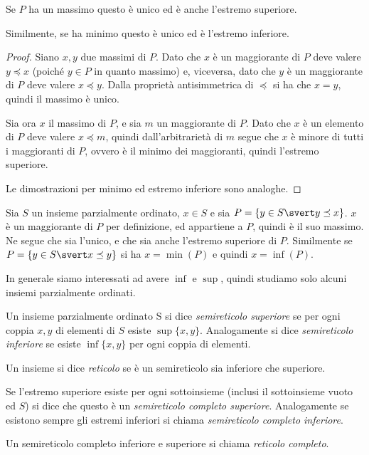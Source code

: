 \documentclass[12pt]{article}
\numberwithin{theorem}{subsection}
\begin{document}
\begin{prop}
	Se $P$ ha un massimo questo è unico ed è anche l'estremo superiore.
	
	Similmente, se ha minimo questo è unico ed è l'estremo inferiore.
\end{prop}
\begin{proof}
	Siano $x, y$ due massimi di $P$. Dato che $x$ è un maggiorante di $P$ deve valere $y \preceq x$ (poiché $y \in P$ in quanto massimo) e, viceversa, dato che $y$ è un maggiorante di $P$ deve valere $x \preceq y$. Dalla proprietà antisimmetrica di $\preceq$ si ha che $x = y$, quindi il massimo è unico.
	
	Sia ora $x$ il massimo di $P$, e sia $m$ un maggiorante di $P$. Dato che $x$ è un elemento di $P$ deve valere $x \preceq m$, quindi dall'arbitrarietà di $m$ segue che $x$ è minore di tutti i maggioranti di $P$, ovvero è il minimo dei maggioranti, quindi l'estremo superiore.
	
	Le dimostrazioni per minimo ed estremo inferiore sono analoghe.
\end{proof}

\begin{example}
	Sia $S$ un insieme parzialmente ordinato, $x \in S$ e sia $P = \{ y \in S \svert y \preceq x \}$. $x$ è un maggiorante di $P$ per definizione, ed appartiene a $P$, quindi è il suo massimo. Ne segue che sia l'unico, e che sia anche l'estremo superiore di $P$. Similmente se $P = \{ y \in S \svert x \preceq y \}$ si ha $x = \min(P)$ e quindi $x = \inf(P)$.
\end{example}

In generale siamo interessati ad avere $\inf$ e $\sup$, quindi studiamo solo alcuni insiemi parzialmente ordinati.

\begin{definition}[Reticolo]
	Un insieme parzialmente ordinato S si dice \textit{semireticolo superiore} se per ogni coppia $x, y$ di elementi di $S$ esiste $\sup\{x, y\}$. Analogamente si dice \textit{semireticolo inferiore} se esiste $\inf\{x, y\}$ per ogni coppia di elementi.
	
	Un insieme si dice \textit{reticolo} se è un semireticolo sia inferiore che superiore.
	
	Se l'estremo superiore esiste per ogni sottoinsieme (inclusi il sottoinsieme vuoto ed $S$) si dice che questo è un \textit{semireticolo completo superiore}. Analogamente se esistono sempre gli estremi inferiori si chiama \textit{semireticolo completo inferiore}.
	
	Un semireticolo completo inferiore e superiore si chiama \textit{reticolo completo}.
\end{definition}
\end{document}
